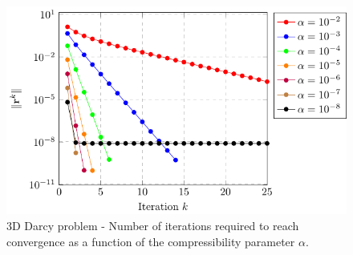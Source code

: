 \documentclass{wccm2024}
\begin{document}
\begin{figure}[!ht]
     \hfill
    \includegraphics[trim={8.8cm 0cm 0cm 0cm},clip,scale=0.78]{figs/convergence-n-20.pdf}
    \caption{3D Darcy problem - Number of iterations required to reach convergence as a function of the compressibility parameter $\alpha$.}
    \label{fig:convergence-alpha}
\end{figure}
\end{document}
